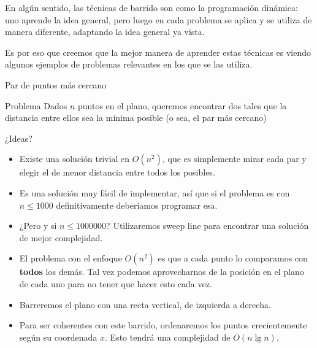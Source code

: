 \documentclass[compress]{beamer}
\begin{document}
\begin{frame}
En alg\'un sentido, las t\'ecnicas de barrido son como la programaci\'on din\'amica: uno aprende la idea general, pero luego en cada problema se aplica y se utiliza de manera diferente, adaptando la idea general ya vista.
\bigskip

Es por eso que creemos que la mejor manera de aprender estas t\'ecnicas es viendo algunos ejemplos de problemas relevantes en los que se las utiliza.
\end{frame}

\begin{frame}{Par de puntos m\'as cercano}
\begin{block}{Problema}
Dados $n$ puntos en el plano, queremos encontrar dos tales que la distancia entre ellos sea la m\'inima posible (o sea, el par m\'as cercano)
\end{block}
\bigskip
¿Ideas? \pause 
{}
\end{frame}

\begin{frame}
\begin{itemize}
\item Existe una soluci\'on trivial en $O(n^2)$, que es simplemente mirar cada par y elegir el de menor distancia entre todos los posibles.
\bigskip

\item Es una soluci\'on muy f\'acil de implementar, as\'i que si el problema es con $n \leq 1000$ definitivamente deber\'iamos programar esa.
\bigskip

\item ¿Pero y si $n\leq 1000000$? Utilizaremos sweep line para encontrar una soluci\'on de mejor complejidad.
\end{itemize}
\end{frame}

\begin{frame}
\begin{itemize}
\item El problema con el enfoque $O(n^2)$ es que a cada punto lo comparamos con \textbf{todos} los dem\'as. 
Tal vez podemos aprovecharnos de la posici\'on en el plano de cada uno para no tener que hacer esto cada vez.
\bigskip
\item Barreremos el plano con una recta vertical, de izquierda a derecha.
\bigskip
\item Para ser coherentes con este barrido, ordenaremos los puntos crecientemente seg\'un su coordenada $x$. 
Esto tendr\'a una complejidad de $O(n \lg n)$.
\end{itemize}
\end{frame}
\end{document}

